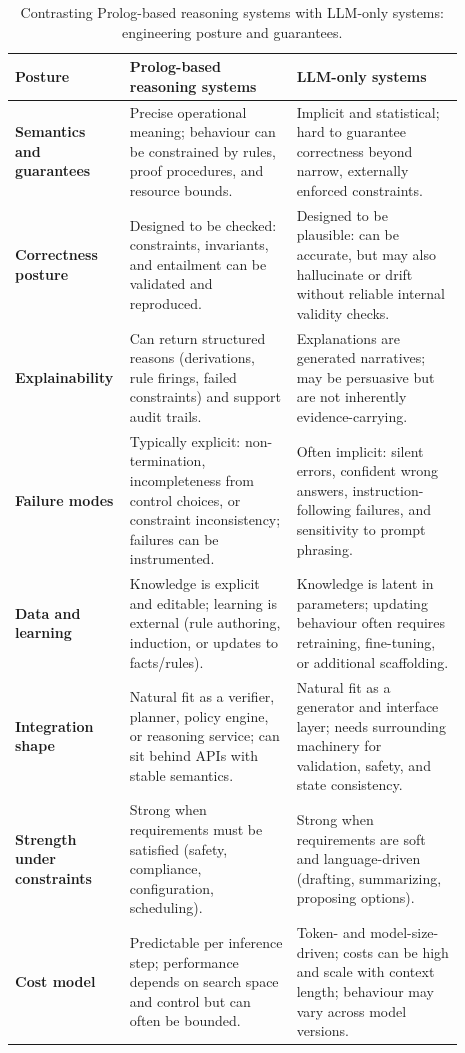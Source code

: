\begin{table}[ht]
\centering
\setlength{\tabcolsep}{6pt}
\renewcommand{\arraystretch}{1.25}
\begin{tabular}{|p{0.17\linewidth}|p{0.36\linewidth}|p{0.36\linewidth}|}
\hline
\textbf{Posture} & \textbf{Prolog-based reasoning systems} & \textbf{LLM-only systems} \\
\hline
\textbf{Semantics and guarantees} &
Precise operational meaning; behaviour can be constrained by rules, proof procedures, and resource bounds. &
Implicit and statistical; hard to guarantee correctness beyond narrow, externally enforced constraints. \\
\hline
\textbf{Correctness posture} &
Designed to be checked: constraints, invariants, and entailment can be validated and reproduced. &
Designed to be plausible: can be accurate, but may also hallucinate or drift without reliable internal validity checks. \\
\hline
\textbf{Explainability} &
Can return structured reasons (derivations, rule firings, failed constraints) and support audit trails. &
Explanations are generated narratives; may be persuasive but are not inherently evidence-carrying. \\
\hline
\textbf{Failure modes} &
Typically explicit: non-termination, incompleteness from control choices, or constraint inconsistency; failures can be instrumented. &
Often implicit: silent errors, confident wrong answers, instruction-following failures, and sensitivity to prompt phrasing. \\
\hline
\textbf{Data and learning} &
Knowledge is explicit and editable; learning is external (rule authoring, induction, or updates to facts/rules). &
Knowledge is latent in parameters; updating behaviour often requires retraining, fine-tuning, or additional scaffolding. \\
\hline
\textbf{Integration shape} &
Natural fit as a verifier, planner, policy engine, or reasoning service; can sit behind APIs with stable semantics. &
Natural fit as a generator and interface layer; needs surrounding machinery for validation, safety, and state consistency. \\
\hline
\textbf{Strength under constraints} &
Strong when requirements must be satisfied (safety, compliance, configuration, scheduling). &
Strong when requirements are soft and language-driven (drafting, summarizing, proposing options). \\
\hline
\textbf{Cost model} &
Predictable per inference step; performance depends on search space and control but can often be bounded. &
Token- and model-size-driven; costs can be high and scale with context length; behaviour may vary across model versions. \\
\hline
\end{tabular}
\caption{Contrasting Prolog-based reasoning systems with LLM-only systems: engineering posture and guarantees.}
\label{tab:prolog-vs-llm-posture}
\end{table}

